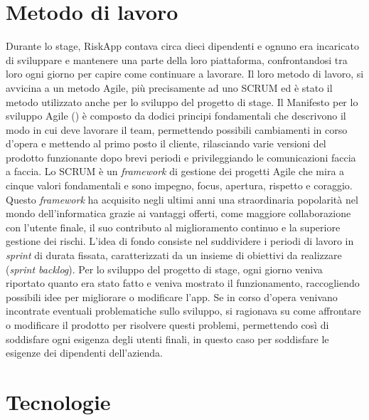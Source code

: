 \section{Metodo di lavoro}
Durante lo stage, RiskApp contava circa dieci dipendenti e ognuno era incaricato di sviluppare e mantenere una parte della loro piattaforma, confrontandosi tra loro ogni giorno per capire come continuare a lavorare.\newline
Il loro metodo di lavoro, si avvicina a un metodo Agile, più precisamente ad uno SCRUM ed è stato il metodo utilizzato anche per lo sviluppo del progetto di stage.\newline
\newline
Il Manifesto per lo sviluppo Agile (\cite{site:manifesto-agile}) è composto da dodici principi fondamentali che descrivono il modo in cui deve lavorare il team, permettendo possibili cambiamenti in corso d'opera e mettendo al primo posto il cliente, rilasciando varie versioni del prodotto funzionante dopo brevi periodi e privileggiando le comunicazioni faccia a faccia.\newline
Lo SCRUM è un \emph{framework} di gestione dei progetti Agile che mira a cinque valori fondamentali e sono impegno, focus, apertura, rispetto e coraggio.\newline
Questo \emph{framework} ha acquisito negli ultimi anni una straordinaria popolarità nel mondo dell’informatica grazie ai vantaggi offerti, come maggiore collaborazione con l’utente finale, il suo contributo al miglioramento continuo e la superiore gestione dei rischi.\newline
L’idea di fondo consiste nel suddividere i periodi di lavoro in \emph{sprint} di durata fissata, caratterizzati da un insieme di obiettivi da realizzare (\emph{sprint backlog}).\newline
\newline
Per lo sviluppo del progetto di stage, ogni giorno veniva riportato quanto era stato fatto e veniva mostrato il funzionamento, raccogliendo possibili idee per migliorare o modificare l'app.\newline
Se in corso d'opera venivano incontrate eventuali problematiche sullo sviluppo, si ragionava su come affrontare o modificare il prodotto per risolvere questi problemi, permettendo così di soddisfare ogni esigenza degli utenti finali, in questo caso per soddisfare le esigenze dei dipendenti dell'azienda.

\newpage

\section{Tecnologie}


